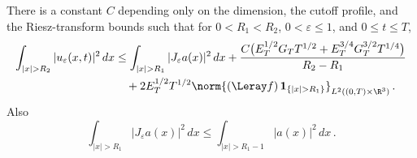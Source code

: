 \documentclass[11pt,reqno]{amsart}
\begin{document}
\begin{lemma}\label{lem:forced-tails}
There is a constant $C$ depending only on the dimension, the cutoff profile,
and the Riesz-transform bounds such that for $0<R_1<R_2$,
$0<\varepsilon\le1$, and $0\le t\le T$,
\begin{align}\label{eq:forced-tails}
 \int_{|x|>R_2}|u_\varepsilon(x,t)|^2\,dx
 &\le \int_{|x|>R_1}|J_\varepsilon a(x)|^2\,dx
 +\frac{C\bigl(E_T^{1/2}G_T T^{1/2}
                  +E_T^{3/4}G_T^{3/2}T^{1/4}\bigr)}{R_2-R_1}\notag\\
 &\quad+2E_T^{1/2}T^{1/2}
   \norm{(\Leray f)\,\mathbf 1_{\{|x|>R_1\}}}_{L^2((0,T)\times\R^3)}\,.
\end{align}
Also
\begin{equation}\label{eq:forced-initial-tail}
 \int_{|x|>R_1}|J_\varepsilon a(x)|^2\,dx
 \le \int_{|x|>R_1-1}|a(x)|^2\,dx\,.
\end{equation}
\end{lemma}
\end{document}

